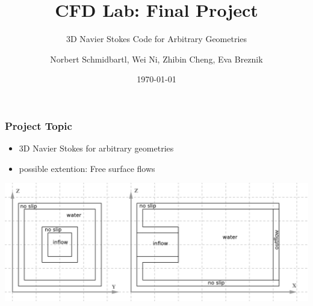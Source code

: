 \documentclass{beamer}
\title{CFD Lab: Final Project}
\subtitle{3D Navier Stokes Code for Arbitrary Geometries}    %
\author{Norbert Schmidbartl, Wei Ni, Zhibin Cheng, Eva Breznik}
\institute[TUM]{Technische Universit\"{a}t M\"{u}nchen \\ Fakult\"{a}t f\"{u}r Informatik}
\date{\today}
\begin{document}
\begin{frame}
\maketitle %
\end{frame}





\begin{frame}
\frametitle{Project Topic}

\begin{itemize}
\item 3D Navier Stokes for arbitrary geometries
\item possible extention: Free surface flows
\end{itemize}
\includegraphics[height = 0.40\textheight]{pipeinflow.png}
 
\end{frame}
\end{document}
